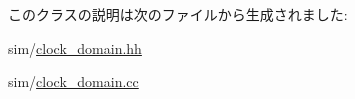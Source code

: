 このクラスの説明は次のファイルから生成されました:\begin{DoxyCompactItemize}
\item 
sim/\hyperlink{clock__domain_8hh}{clock\_\-domain.hh}\item 
sim/\hyperlink{clock__domain_8cc}{clock\_\-domain.cc}\end{DoxyCompactItemize}
